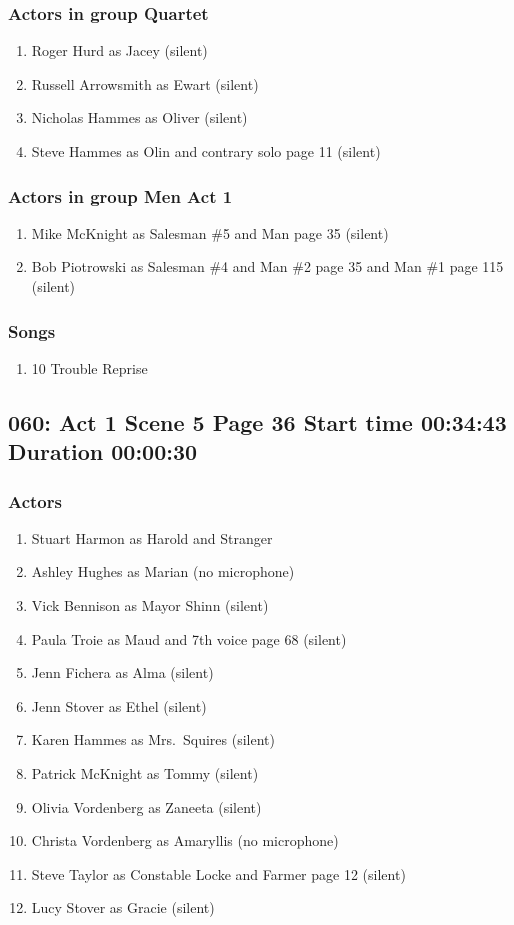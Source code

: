 \subsubsection{Actors in group Quartet}
\begin{enumerate}
\item Roger Hurd as Jacey (silent)
\item Russell Arrowsmith as Ewart (silent)
\item Nicholas Hammes as Oliver (silent)
\item Steve Hammes as Olin and contrary solo page 11 (silent)
\end{enumerate}
\subsubsection{Actors in group Men Act 1}
\begin{enumerate}
\item Mike McKnight as Salesman \#5 and Man page 35 (silent)
\item Bob Piotrowski as Salesman \#4 and Man \#2 page 35 and Man \#1 page 115 (silent)
\end{enumerate}

\subsubsection{Songs}
\begin{enumerate}
\item 10 Trouble Reprise
\end{enumerate}
\subsection{060: Act 1 Scene 5 Page 36 Start time 00:34:43 Duration 00:00:30}

\subsubsection{Actors}
\begin{enumerate}
\item Stuart Harmon as Harold and Stranger
\item Ashley Hughes as Marian (no microphone)
\item Vick Bennison as Mayor Shinn (silent)
\item Paula Troie as Maud and 7th voice page 68 (silent)
\item Jenn Fichera as Alma (silent)
\item Jenn Stover as Ethel (silent)
\item Karen Hammes as Mrs.~Squires (silent)
\item Patrick McKnight as Tommy (silent)
\item Olivia Vordenberg as Zaneeta (silent)
\item Christa Vordenberg as Amaryllis (no microphone)
\item Steve Taylor as Constable Locke and Farmer page 12 (silent)
\item Lucy Stover as Gracie (silent)
\end{enumerate}
